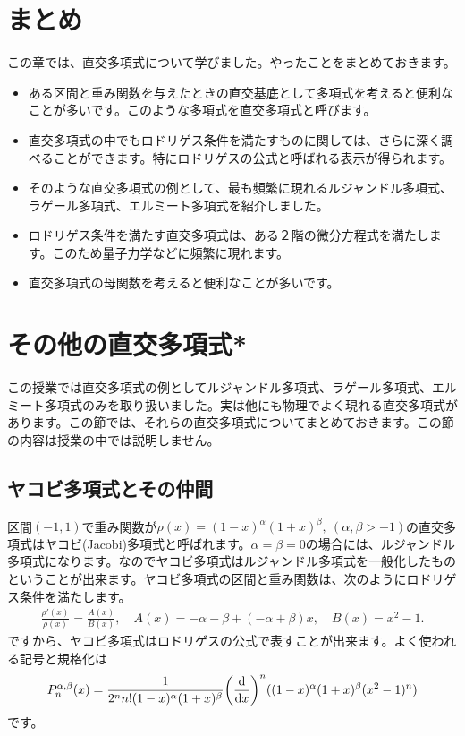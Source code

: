 \documentclass[report,paper=a4, fontsize=12pt, line_length=16cm, number_of_lines=33,dvipdfmx]{jlreq}
\numberwithin{equation}{section}
\begin{document}
\section{まとめ}
この章では、直交多項式について学びました。やったことをまとめておきます。
\begin{itemize}
  \item ある区間と重み関数を与えたときの直交基底として多項式を考えると便利なことが多いです。このような多項式を直交多項式と呼びます。
  \item 直交多項式の中でもロドリゲス条件を満たすものに関しては、さらに深く調べることができます。特にロドリゲスの公式と呼ばれる表示が得られます。
  \item そのような直交多項式の例として、最も頻繁に現れるルジャンドル多項式、ラゲール多項式、エルミート多項式を紹介しました。
  \item ロドリゲス条件を満たす直交多項式は、ある２階の微分方程式を満たします。このため量子力学などに頻繁に現れます。
  \item 直交多項式の母関数を考えると便利なことが多いです。
\end{itemize}


\section{その他の直交多項式*}
この授業では直交多項式の例としてルジャンドル多項式、ラゲール多項式、エルミート多項式のみを取り扱いました。実は他にも物理でよく現れる直交多項式があります。この節では、それらの直交多項式についてまとめておきます。この節の内容は授業の中では説明しません。

\subsection{ヤコビ多項式とその仲間}
区間$(-1,1)$で重み関数が$\rho(x)=(1-x)^{\alpha}(1+x)^{\beta},\ (\alpha,\beta >-1)$の直交多項式はヤコビ(Jacobi)多項式と呼ばれます。$\alpha=\beta=0$の場合には、ルジャンドル多項式になります。なのでヤコビ多項式はルジャンドル多項式を一般化したものということが出来ます。ヤコビ多項式の区間と重み関数は、次のようにロドリゲス条件を満たします。
\begin{align}
  \frac{\rho'(x)}{\rho(x)}=\frac{A(x)}{B(x)},\quad A(x)=-\alpha-\beta+(-\alpha+\beta)x,\quad B(x)=x^2-1.
\end{align}
ですから、ヤコビ多項式はロドリゲスの公式で表すことが出来ます。よく使われる記号と規格化は
\begin{align}
  P^{\alpha,\beta}_n(x)=\frac{1}{2^n n!(1-x)^{\alpha}(1+x)^{\beta}}\qty(\dv{x})^n((1-x)^{\alpha}(1+x)^{\beta}(x^2-1)^n)
\end{align}
です。
\end{document}
